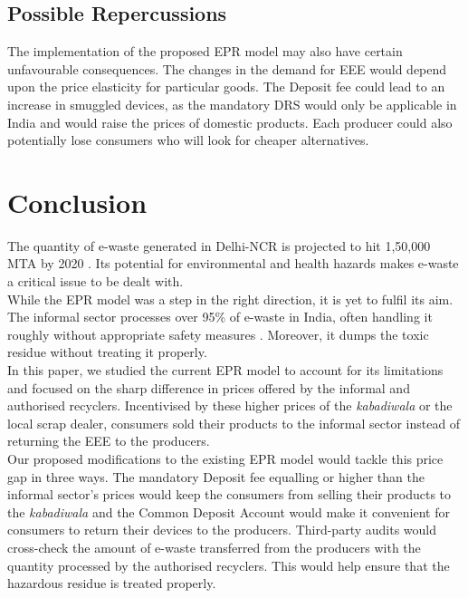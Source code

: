 \documentclass[a4paper, 12pt]{article}
\begin{document}
                    \subsection{Possible Repercussions}
                    
                    The implementation of the proposed EPR model may also have certain unfavourable consequences. The changes in the demand for EEE would depend upon the price elasticity for particular goods. The Deposit fee could lead to an increase in smuggled devices, as the mandatory DRS would only be applicable in India and would raise the prices of domestic products. Each producer could also potentially lose consumers who will look for cheaper alternatives. 
                    
                    
                    \section{Conclusion}
                    
                    The quantity of e-waste generated in Delhi-NCR is projected to hit 1,50,000 MTA by 2020 \parencite{assochamdelhi}. Its potential for environmental and health hazards makes e-waste a critical issue to be dealt with.\\
                     
                     While the EPR model was a step in the right direction, it is yet to fulfil its aim. The informal sector processes over 95\% of e-waste in India, often handling it roughly without appropriate safety measures \parencite{assochamstats}. Moreover, it dumps the toxic residue without treating it properly.\\ 
                    
                    In this paper, we studied the current EPR model to account for its limitations and focused on the sharp difference in prices offered by the informal and authorised recyclers. Incentivised by these higher prices of the \textit{kabadiwala} or the local scrap dealer, consumers sold their products to the informal sector instead of returning the EEE to the producers.\\
                    
                    Our proposed modifications to the existing EPR model would tackle this price gap in three ways. The mandatory Deposit fee equalling or higher than the informal sector’s prices would keep the consumers from selling their products to the \textit{kabadiwala} and the Common Deposit Account would make it convenient for consumers to return their devices to the producers. Third-party audits would cross-check the amount of e-waste transferred from the producers with the quantity processed by the authorised recyclers. This would help ensure that the hazardous residue is treated properly.\\
                    
\end{document}
